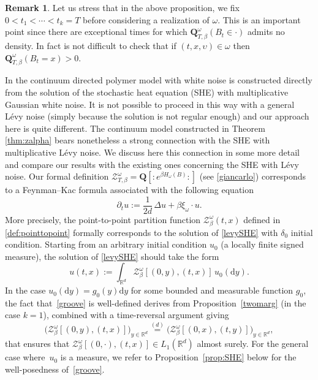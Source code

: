 \documentclass[10pt]{amsart}
\let\mathcal\mathscr
\theoremstyle{definition}
\newtheorem{rem}[theorem]{Remark}
\newcommand{\dd}{\mathrm{d}}
\newcommand{\cZ}{{\ensuremath{\mathcal Z}} }
\newcommand{\bQ}{{\ensuremath{\mathbf Q}} }
\newcommand{\bbR}{{\ensuremath{\mathbb R}} }
\let\gD\Delta
\let\ups\upsilon
\let\go\omega
\begin{document}
\begin{rem}
Let us stress that in the above proposition,
we fix \hbox{$0\!<\!t_1\!<\!\cdots\!<\!t_k\!=\!T$}
before considering a realization of $\go$.
This is an important point since there are exceptional times for which $\bQ^{\go}_{T,\beta}(B_{t}\in \cdot)$
admits no density. In fact is not difficult to check that if $(t,x,\ups)\in \go$ then
$\bQ^{\go}_{T,\beta}(B_{t}=x)>0$.
\end{rem}

\label{sec:SHE}

In \cite{AKQ14b} the continuum directed polymer model with white noise is constructed direct\-ly from the solution of the stochastic heat equation (SHE) with multiplicative Gaussian white noise. It is not possible to proceed in this way with a general Lévy noise (simply because the solution is not regular enough) and our approach here is quite different.
The continuum model constructed in Theorem \ref{thm:zalpha} bears nonetheless a strong connection
with the SHE with multiplicative Lévy noise. We discuss here this connection in some more detail and compare our results with the existing ones concerning the SHE with Lévy noise.
Our formal definition $\cZ^{\go}_{T,\beta} = \bQ\left[ \mathbf{:}e^{\beta H_\go(B)}\mathbf{:} \right]$ (see \eqref{giancarlo}) corresponds to a Feynman--Kac formula associated with the following equation
\begin{equation}\label{levySHE}
\partial_t u:= \frac{1}{2d}\, \gD u + \beta \xi_{\go} \cdot u.
\end{equation}
More precisely, the point-to-point partition function $\cZ^{\go}_{\beta}(t,x)$ defined in \eqref{def:pointtopoint}
formally corresponds to the solution of \eqref{levySHE} with
$\delta_0$ initial condition.
Starting from an arbitrary initial condition $u_0$ (a locally finite signed measure), the solution of \eqref{levySHE} should take
the form
\begin{equation}\label{groove}
u(t,x):= \int_{\bbR^d} \cZ^{\go}_{\beta}[(0,y),(t,x)] \, u_0(\dd y).
\end{equation}
In the case $u_0(\dd y) = g_0(y) \dd y$ for some bounded and measurable function $g_0$,
the fact that~\eqref{groove}
is well-defined
derives from Proposition~\ref{twomarg} (in the case $k=1$), combined
with a time-reversal argument giving
\[
\bigl(\cZ^{\go}_{\beta}[(0,y),(t,x)] \bigr)_{y \in \bbR^d}\stackrel{(d)}{=} \bigl(\cZ^{\go}_{\beta}[(0,x),(t,y)]\bigr)_{y \in \bbR^d},
\]
that ensures that $\cZ^{\go}_{\beta}[(0,\cdot),(t,x)]\in L_1(\bbR^d)$
almost surely.
For the general case where~$u_0$ is a measure,
we refer to Proposition~\ref{prop:SHE} below
for the well-posedness of~\eqref{groove}.
\end{document}
